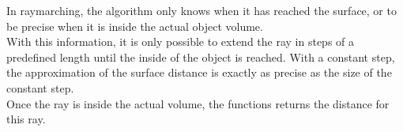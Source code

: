 \begin{figure}[H]
    \centering
\end{figure}

\pagebreak
\noindent
In \gls{raymarching}, the algorithm only knows when it has reached the surface, or to be precise when it is inside the actual object volume.
\\
With this information, it is only possible to extend the ray in steps of a predefined length until the inside of the object is reached.
With a constant step, the approximation of the surface distance is exactly as precise as the size of the constant step.
\\
Once the ray is inside the actual volume, the functions returns the distance for this ray.

